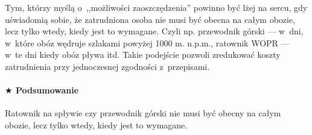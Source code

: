 \documentclass[a5paper,10pt,titlepage,twoside]{article}
\newcommand*{\thecheckbox}{\hss$\Box$} %
\newenvironment*{checklist}
{\list{}{%
\renewcommand*{\makelabel}[1]{\thecheckbox}}}
{\endlist}
\begin{document}
Tym, którzy myślą o~,,możliwości zaoszczędzenia'' powinno być lżej na sercu, gdy uświadomią sobie, że zatrudniona osoba nie musi być obecna na całym obozie, lecz tylko wtedy, kiedy jest to wymagane. Czyli np. przewodnik górski ---  w~dni, w~które obóz wędruje szlakami powyżej 1000 m. n.p.m., ratownik WOPR --- w~te dni kiedy obóz pływa itd. Takie podejście pozwoli zredukować koszty zatrudnienia przy jednoczesnej zgodności z~przepisami.

\paragraph{$\bigstar$ Podsumowanie}
\begin{checklist}
\item Ratownik na spływie czy przewodnik górski nie musi być obecny na całym obozie, lecz tylko wtedy, kiedy jest to wymagane.
\end{checklist}
\end{document}
